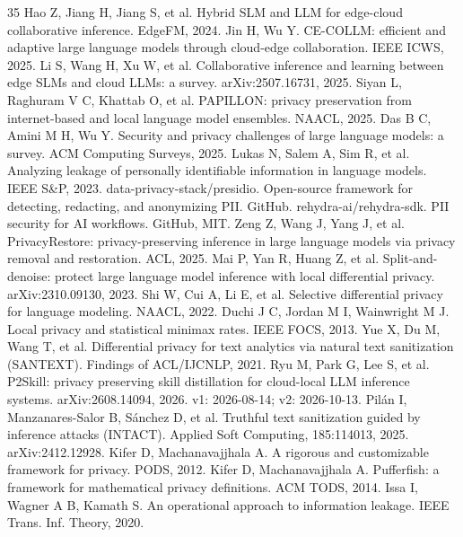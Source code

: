 \documentclass[11pt,a4paper]{article}
\begin{document}
\begin{thebibliography}{35}
 Hao Z, Jiang H, Jiang S, et al. Hybrid SLM and LLM for edge-cloud collaborative inference. EdgeFM, 2024.
 Jin H, Wu Y. CE-COLLM: efficient and adaptive large language models through cloud-edge collaboration. IEEE ICWS, 2025.
 Li S, Wang H, Xu W, et al. Collaborative inference and learning between edge SLMs and cloud LLMs: a survey. arXiv:2507.16731, 2025.
 Siyan L, Raghuram V C, Khattab O, et al. PAPILLON: privacy preservation from internet-based and local language model ensembles. NAACL, 2025.
 Das B C, Amini M H, Wu Y. Security and privacy challenges of large language models: a survey. ACM Computing Surveys, 2025.
 Lukas N, Salem A, Sim R, et al. Analyzing leakage of personally identifiable information in language models. IEEE S\&P, 2023.
 data-privacy-stack/presidio. Open-source framework for detecting, redacting, and anonymizing PII. GitHub.
 rehydra-ai/rehydra-sdk. PII security for AI workflows. GitHub, MIT.
 Zeng Z, Wang J, Yang J, et al. PrivacyRestore: privacy-preserving inference in large language models via privacy removal and restoration. ACL, 2025.
 Mai P, Yan R, Huang Z, et al. Split-and-denoise: protect large language model inference with local differential privacy. arXiv:2310.09130, 2023.
 Shi W, Cui A, Li E, et al. Selective differential privacy for language modeling. NAACL, 2022.
 Duchi J C, Jordan M I, Wainwright M J. Local privacy and statistical minimax rates. IEEE FOCS, 2013.
 Yue X, Du M, Wang T, et al. Differential privacy for text analytics via natural text sanitization (SANTEXT). Findings of ACL/IJCNLP, 2021.
 Ryu M, Park G, Lee S, et al. P2Skill: privacy preserving skill distillation for cloud-local LLM inference systems. arXiv:2608.14094, 2026. v1: 2026-08-14; v2: 2026-10-13.
 Pil\'an I, Manzanares-Salor B, S\'anchez D, et al. Truthful text sanitization guided by inference attacks (INTACT). Applied Soft Computing, 185:114013, 2025. arXiv:2412.12928.
 Kifer D, Machanavajjhala A. A rigorous and customizable framework for privacy. PODS, 2012.
 Kifer D, Machanavajjhala A. Pufferfish: a framework for mathematical privacy definitions. ACM TODS, 2014.
 Issa I, Wagner A B, Kamath S. An operational approach to information leakage. IEEE Trans. Inf. Theory, 2020.

\end{thebibliography}
\end{document}
